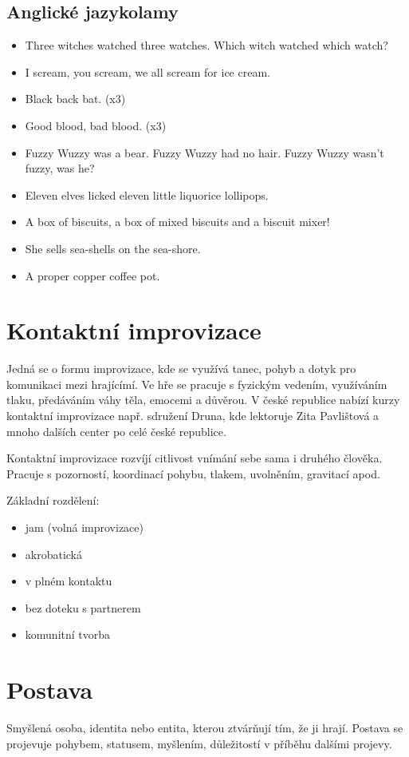 \subsection{ Anglické jazykolamy }  
\begin{itemize}
\item  Three witches watched three watches. Which witch watched which watch?
\item  I scream, you scream, we all scream for ice cream.
\item  Black back bat. (x3)
\item  Good blood, bad blood. (x3)
\item  Fuzzy Wuzzy was a bear. Fuzzy Wuzzy had no hair. Fuzzy Wuzzy wasn’t fuzzy, was he?
\item  Eleven elves licked eleven little liquorice lollipops.
\item  A box of biscuits, a box of mixed biscuits and a biscuit mixer!
\item  She sells sea-shells on the sea-shore.
\item  A proper copper coffee pot.
\end{itemize}
 
 
\needspace{5cm} \section{Kontaktní improvizace} \label{kontaktní improvizace} Jedná se o formu improvizace, kde se využívá tanec, pohyb a dotyk pro komunikaci mezi hrajícímí. Ve hře se pracuje s fyzickým vedením, využíváním tlaku, předáváním váhy těla, emocemi a důvěrou. V české republice nabízí  kurzy kontaktní improvizace např. sdružení Druna, kde lektoruje Zita Pavlištová a mnoho dalších center po celé české republice. 
 
Kontaktní improvizace rozvíjí citlivost vnímání sebe sama i druhého člověka. Pracuje s pozorností, koordinací pohybu, tlakem, uvolněním, gravitací apod. 
 
Základní rozdělení: 
 
\begin{itemize}
\item  jam (volná improvizace)
\item  akrobatická
\item  v plném kontaktu
\item  bez doteku s partnerem
\item  komunitní tvorba
\end{itemize}
 
\needspace{5cm} \section{Postava} \label{postava} Smyšlená osoba, identita nebo entita, kterou ztvárňují  tím, že ji hrají. Postava se projevuje pohybem, statusem, myšlením, důležitostí v příběhu dalšími projevy. 
 

